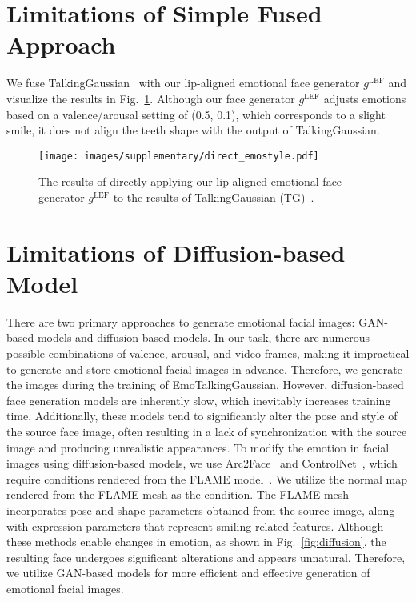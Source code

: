\section{Limitations of Simple Fused Approach}
We fuse TalkingGaussian~\cite{li2024talkinggaussian} with our lip-aligned emotional face generator $g^\text{LEF}$ and visualize the results in Fig.~\ref{fig:direct emostyle}. Although our face generator $g^\text{LEF}$ adjusts emotions based on a valence/arousal setting of (0.5, 0.1), which corresponds to a slight smile, it does not align the teeth shape with the output of TalkingGaussian.

\begin{figure}
    \centering
    \texttt{[image: images/supplementary/direct\_emostyle.pdf]}
    \caption{The results of directly applying our lip-aligned emotional face generator $g^\text{LEF}$ to the results of TalkingGaussian (TG)~\cite{li2024talkinggaussian}.}
    \label{fig:direct emostyle}
\end{figure}

\section{Limitations of Diffusion-based Model}
There are two primary approaches to generate emotional facial images: GAN-based models and diffusion-based models. In our task, there are numerous possible combinations of valence, arousal, and video frames, making it impractical to generate and store emotional facial images in advance. Therefore, we generate the images during the training of EmoTalkingGaussian. However, diffusion-based face generation models are inherently slow, which inevitably increases training time. Additionally, these models tend to significantly alter the pose and style of the source face image, often resulting in a lack of synchronization with the source image and producing unrealistic appearances. To modify the emotion in facial images using diffusion-based models, we use Arc2Face~\cite{paraperas2024arc2face} and ControlNet~\cite{zhang2023adding}, which require conditions rendered from the FLAME model~\cite{li2017learning}. We utilize the normal map rendered from the FLAME mesh as the condition. The FLAME mesh incorporates pose and shape parameters obtained from the source image, along with expression parameters that represent smiling-related features. Although these methods enable changes in emotion, as shown in Fig.~\ref{fig:diffusion}, the resulting face undergoes significant alterations and appears unnatural. Therefore, we utilize GAN-based models for more efficient and effective generation of emotional facial images.

